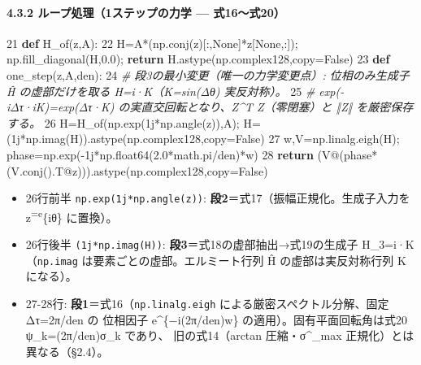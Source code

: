 \documentclass[
  a4paper,
]{ltjsarticle}
\newenvironment{Shaded}{}{}
\newcommand{\CommentTok}[1]{\textcolor[rgb]{0.38,0.63,0.69}{\textit{#1}}}
\newcommand{\ControlFlowTok}[1]{\textcolor[rgb]{0.00,0.44,0.13}{\textbf{#1}}}
\newcommand{\DecValTok}[1]{\textcolor[rgb]{0.25,0.63,0.44}{#1}}
\newcommand{\FloatTok}[1]{\textcolor[rgb]{0.25,0.63,0.44}{#1}}
\newcommand{\KeywordTok}[1]{\textcolor[rgb]{0.00,0.44,0.13}{\textbf{#1}}}
\newcommand{\NormalTok}[1]{#1}
\newcommand{\OperatorTok}[1]{\textcolor[rgb]{0.40,0.40,0.40}{#1}}
\newcommand{\OtherTok}[1]{\textcolor[rgb]{0.00,0.44,0.13}{#1}}
\newcommand{\VariableTok}[1]{\textcolor[rgb]{0.10,0.09,0.49}{#1}}
\providecommand{\tightlist}{%
  \setlength{\itemsep}{0pt}\setlength{\parskip}{0pt}}
\begin{document}
\paragraph{4.3.2 ループ処理（1ステップの力学 ---
式16〜式20）}\label{ux30ebux30fcux30d7ux51e6ux74061ux30b9ux30c6ux30c3ux30d7ux306eux529bux5b66-ux5f0f16ux5f0f20}

\begin{Shaded}
\begin{Highlighting}[]
    \DecValTok{21}  \KeywordTok{def}\NormalTok{ H\_of(z,A):}
    \DecValTok{22}\NormalTok{      H}\OperatorTok{=}\NormalTok{A}\OperatorTok{*}\NormalTok{(np.conj(z)[:,}\VariableTok{None}\NormalTok{]}\OperatorTok{*}\NormalTok{z[}\VariableTok{None}\NormalTok{,:])}\OperatorTok{;}\NormalTok{ np.fill\_diagonal(H,}\FloatTok{0.0}\NormalTok{)}\OperatorTok{;} \ControlFlowTok{return}\NormalTok{ H.astype(np.complex128,copy}\OperatorTok{=}\VariableTok{False}\NormalTok{)}
    \DecValTok{23}  \KeywordTok{def}\NormalTok{ one\_step(z,A,den):}
    \DecValTok{24}      \CommentTok{\# 段3の最小変更（唯一の力学変更点）: 位相のみ生成子 Ĥ の虚部だけを取る H=i·K（K=sin(Δθ) 実反対称）。}
    \DecValTok{25}      \CommentTok{\# exp({-}iΔτ·iK)=exp(Δτ·K) の実直交回転となり、Z\^{}T Z（零閉塞）と ‖Z‖ を厳密保存する。}
    \DecValTok{26}\NormalTok{      H}\OperatorTok{=}\NormalTok{H\_of(np.exp(}\OtherTok{1j}\OperatorTok{*}\NormalTok{np.angle(z)),A)}\OperatorTok{;}\NormalTok{ H}\OperatorTok{=}\NormalTok{(}\OtherTok{1j}\OperatorTok{*}\NormalTok{np.imag(H)).astype(np.complex128,copy}\OperatorTok{=}\VariableTok{False}\NormalTok{)}
    \DecValTok{27}\NormalTok{      w,V}\OperatorTok{=}\NormalTok{np.linalg.eigh(H)}\OperatorTok{;}\NormalTok{ phase}\OperatorTok{=}\NormalTok{np.exp(}\OperatorTok{{-}}\OtherTok{1j}\OperatorTok{*}\NormalTok{np.float64(}\FloatTok{2.0}\OperatorTok{*}\NormalTok{math.pi}\OperatorTok{/}\NormalTok{den)}\OperatorTok{*}\NormalTok{w)}
    \DecValTok{28}      \ControlFlowTok{return}\NormalTok{ (V}\OperatorTok{@}\NormalTok{(phase}\OperatorTok{*}\NormalTok{(V.conj().T}\OperatorTok{@}\NormalTok{z))).astype(np.complex128,copy}\OperatorTok{=}\VariableTok{False}\NormalTok{)}
\end{Highlighting}
\end{Shaded}

\begin{itemize}
\tightlist
\item
  26行前半 \texttt{np.exp(1j*np.angle(z))}:
  \textbf{段2}＝式17（振幅正規化。生成子入力を
  z\textsuperscript{=e}\{iθ\} に置換）。
\item
  26行後半 \texttt{(1j*np.imag(H))}:
  \textbf{段3}＝式18の虚部抽出→式19の生成子 H\_3=i·K （\texttt{np.imag}
  は要素ごとの虚部。エルミート行列 Ĥ の虚部は実反対称行列 K になる）。
\item
  27-28行: \textbf{段1}＝式16（\texttt{np.linalg.eigh}
  による厳密スペクトル分解、固定 Δτ=2π/den の 位相因子
  e\^{}\{−i(2π/den)w\} の適用）。固有平面回転角は式20 ψ\_k=(2π/den)σ\_k
  であり、 旧の式14（arctan 圧縮・σ\^{}\_max
  正規化）とは異なる（§2.4）。
\end{itemize}
\end{document}
